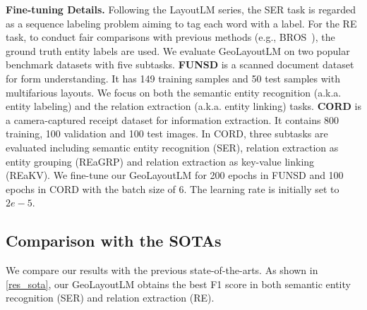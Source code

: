 \documentclass[10pt,twocolumn,letterpaper]{article}
\begin{document}
\noindent \textbf{Fine-tuning Details.}
Following the LayoutLM series\cite{gu2022xylayoutlm,xu2020layoutlmv2,huang2022layoutlmv3}, the SER task is regarded as a sequence labeling problem aiming to tag each word with a label.
For the RE task, to conduct fair comparisons with previous methods (e.g., BROS~\cite{hong2022bros}), the ground truth entity labels are used.
We evaluate GeoLayoutLM on two popular benchmark datasets with five subtasks.
\textbf{FUNSD}\cite{jaume2019funsd} is a scanned document dataset for form understanding. It has 149 training samples and 50 test samples with multifarious layouts. We focus on both the semantic entity recognition (a.k.a. entity labeling) and the relation extraction (a.k.a. entity linking) tasks.
\textbf{CORD}\cite{park2019cord} is a camera-captured receipt dataset for information extraction. It contains 800 training, 100 validation and 100 test images. In CORD, three subtasks are evaluated including semantic entity recognition (SER), relation extraction as entity grouping (REaGRP) and relation extraction as key-value linking (REaKV).
We fine-tune our GeoLayoutLM for 200 epochs in FUNSD and 100 epochs in CORD with the batch size of 6. The learning rate is initially set to $2e-5$.

\subsection{Comparison with the SOTAs}
We compare our results with the previous state-of-the-arts. As shown in \cref{res_sota}, our GeoLayoutLM obtains the best F1 score in both semantic entity recognition (SER) and relation extraction (RE). 
\end{document}
